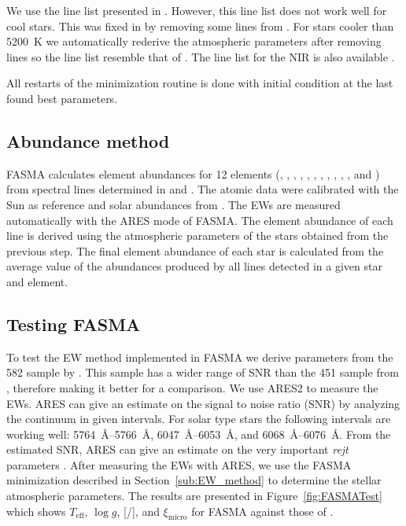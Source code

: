 \documentclass{aa}
\begin{document}
We use the line list presented in \citet{Sousa2008a}. However, this line list
does not work well for cool stars. This was fixed in \citet{Tsantaki2013} by
removing some lines from \citet{Sousa2008a}. For stars cooler than \SI{5200}{K}
we automatically rederive the atmospheric parameters after removing lines so the
line list resemble that of \citet{Tsantaki2013}. The line list for the NIR is
also available \citep{Andreasen2016}.

All restarts of the minimization routine is done with initial condition at the
last found best parameters.


\subsection{Abundance method}
\label{sub:Abundance_method}

FASMA calculates element abundances for 12 elements (, ,
, , , , , ,
, , , and ) from spectral lines
determined in \citet{Neves2009} and \citet{Adibekyan2012}. The atomic data were
calibrated with the Sun as reference and solar abundances from
\citet{Anders1989}. The EWs are measured automatically with the ARES mode of
FASMA. The element abundance of each line is derived using the atmospheric
parameters of the stars obtained from the previous step. The final element
abundance of each star is calculated from the average value of the abundances
produced by all lines detected in a given star and element.


\subsection{Testing FASMA}
\label{sub:Testing_FASMA}
To test the EW method implemented in FASMA we derive parameters from the 582
sample by \citet{Sousa2011}. This sample has a wider range of SNR than the 451
sample from \citet{Tsantaki2013}, therefore making it better for a comparison.
We use ARES2 to measure the EWs. ARES can give an estimate on the signal to
noise ratio (SNR) by analyzing the continuum in given intervals. For solar type
stars the following intervals are working well: \SIrange{5764}{5766}{\angstrom},
\SIrange{6047}{6053}{\angstrom}, and \SIrange{6068}{6076}{\angstrom}. From the
estimated SNR, ARES can give an estimate on the very important \emph{rejt}
parameters \citep[see][for more information]{Sousa2015a}. After measuring the
EWs with ARES, we use the FASMA minimization described in
Section~\ref{sub:EW_method} to determine the stellar atmospheric parameters. The
results are presented in Figure~\ref{fig:FASMATest} which shows
$T_\mathrm{eff}$, $\log g$, [/], and $\xi_\mathrm{micro}$ for
FASMA against those of \citet{Sousa2011}.
\end{document}
